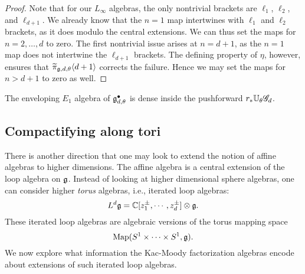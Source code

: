 
\begin{proof}
Note that for our $L_\infty$ algebras, the only nontrivial brackets are $\ell_1$, $\ell_2$, and $\ell_{d+1}$.
We already know that the $n=1$ map intertwines with $\ell_1$ and $\ell_2$ brackets,
as it does modulo the central extensions.
We can thus set the maps for $n=2,\ldots, d$ to zero. 
The first nontrivial issue arises at $n=d+1$, as the $n=1$ map does not intertwine the $\ell_{d+1}$ brackets.
The defining property of $\eta$, however, ensures that $\widetilde{\pi}_{\mathfrak g,d,\theta}\langle d+1\rangle$ corrects the failure.
Hence we may set the maps for $n > d+1$ to zero as well.
\end{proof}

\begin{cor}
The enveloping $E_1$ algebra of $\mathfrak g^\bullet_{d,\theta}$ is dense inside the pushforward $r_* \mathbb U_\theta\mathscr G_d$.
\end{cor}

\subsection{Compactifying along tori} 

There is another direction that one may look to extend the notion of affine algebras to higher dimensions.
The affine algebra is a central extension of the loop algebra on $\mathfrak g$. 
Instead of looking at higher dimensional sphere algebras, one can consider higher {\em torus} algebras, i.e., iterated loop algebras:
\[
L^d \mathfrak g = \mathbb C[z_1^{\pm}, \cdots, z_d^{\pm}] \otimes \mathfrak g .
\]
These iterated loop algebras are algebraic versions of the torus mapping space 
\[
{\rm Map}(S^1 \times \cdots \times S^1, \mathfrak g).
\] 
We now explore what information the Kac-Moody factorization algebras encode about extensions of such iterated loop algebras.

